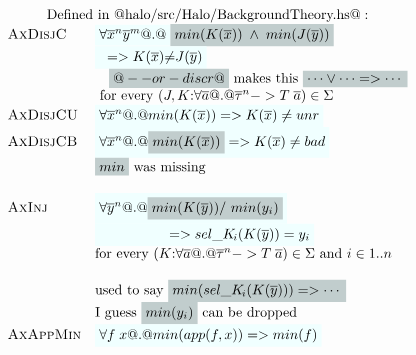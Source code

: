 \begin{figure}
{\[\begin{array}{c}
\begin{array}{lll}
 \\
 \multicolumn{2}{c}{\mbox{Defined in @halo/src/Halo/BackgroundTheory.hs@}:} \\
 \textsc{AxDisjC} & \formula{\forall \oln{x}{n}\oln{y}{m} @.@}\highlight{min(K(\ol{x}))\;\land\;min(J(\ol{y}))}  \\
                  & \formula{\;\;=> K(\ol{x}){\neq}J(\ol{y})} \\
                  & \text{$\quad$\highlight{@--or-discr@} makes this $\highlight{\cdots \lor \cdots => \cdots}$} \\
                  & \text{ for every } (J, K{:}\forall\as @.@ \oln{\tau}{n} -> T\;\as) \in \Sigma \\
 \textsc{AxDisjCU} & \formula{\forall \oln{x}{n} @.@ min(K(\ol{x})) => K(\ol{x}) \neq unr} \\
 \textsc{AxDisjCB} & \formula{\forall \oln{x}{n} @.@ \highlight{min(K(\ol{x}))} => K(\ol{x}) \neq \bad} \\
                   & \text{$\highlight{min}$ was missing}\\ \\
 \textsc{AxInj}   & \formula{\forall \oln{y}{n} @.@ \highlight{min(K(\ys)) /\ min(y_i)}} \\
                  & \formula{\quad\qquad\qquad => \sel{K}{i}(K(\ys)) = y_i} \\
                  & \text{for every } (K{:}\forall\as @.@ \oln{\tau}{n} -> T\;\as) \in \Sigma \text{ and } i \in 1..n  \\ \\
                  & \text{used to say $\highlight{min(\sel{K}{i}(K(\ys))) => \cdots}$} \\
                  & \text{I guess $\highlight{min(y_i)}$ can be dropped} \\
 \textsc{AxAppMin}& \formula{\forall f \; x @.@ min(app(f,x)) => min(f)} \\ \\


\end{array}
\end{array}\]}
\end{figure}
